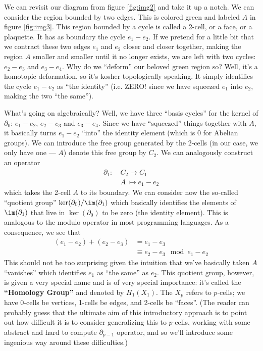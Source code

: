 We can revisit our diagram from figure \ref{fig:img2} and take it
up a notch. We can consider the region bounded by two edges. This
is colored green and labeled $A$ in figure \ref{fig:img3}. This
region bounded by a cycle is called a 2-cell, or a face, or a plaquette.
It has as boundary the cycle $e_{1}-e_{2}$. If we pretend for a
little bit that we contract these two edges $e_{1}$ and $e_{2}$
closer and closer together, making the region $A$ smaller and
smaller until it no longer exists, we are left with two cycles:
$e_{2}-e_{3}$ and $e_{3}-e_{4}$. Why do we ``deform'' our beloved
green region so? Well, it's a homotopic deformation, so it's
kosher topologically speaking. It simply identifies the cycle
$e_{1}-e_{2}$ as ``the identity'' (i.e. ZERO! since we have squeezed
$e_{1}$ into $e_{2}$, making the two ``the same'').

What's going on algebraically? Well, we have three ``basis
cycles'' for the kernel of $\partial_{0}$: $e_{1}-e_{2}$,
$e_{2}-e_{3}$ and $e_{3}-e_{4}$. Since we have ``squeezed''
things together with $A$, it basically turns $e_{1}-e_{2}$
``into'' the identity element (which is 0 for Abelian groups). We
can introduce the free group generated by the 2-cells (in our
case, we only have one --- $A$) denote this free group by
$C_{2}$. We can analogously construct an operator
\begin{equation}%
\begin{split}
\partial_{1}:~&C_{2}\to{C_{1}}\\
              &A~\mapsto{e_{1}-e_{2}}
\end{split}
\end{equation}
which takes the 2-cell $A$ to its boundary. We can consider now
the so-called ``quotient group''
$\ker(\partial_{0})/\im(\partial_{1})$ which basically identifies
the elements of $\im(\partial_{1})$ that live in
$\ker(\partial_{0})$ to be zero (the identity element). This is
analogous to the modulo operator in most programming
languages. As a consequence, we see that
\begin{equation}%
\begin{split}
(e_{1}-e_{2})+(e_{2}-e_{3}) &= e_{1}-e_{3}\\
 &\equiv e_{2}-e_{3} \mod {e_{1}-e_{2}}
\end{split}
\end{equation}
This should not be too surprising given the intuition that we've
basically taken $A$ ``vanishes'' which identifies $e_{1}$ as
``the same'' as $e_{2}$. This quotient group, however, is given a very
special name and is of very special importance: it's called the
\textbf{``Homology Group''} and denoted by $H_{1}(X_{1})$. The
$X_{p}$ refers to $p$-cells; we have 0-cells be vertices, 1-cells
be edges, and 2-cells be ``faces''. (The reader can probably
guess that the ultimate aim of this introductory approach is to
point out how difficult it is to consider generalizing this to
$p$-cells, working with some abstract and hard to compute
$\partial_{p-1}$ operator, and so we'll introduce some ingenious
way around these difficulties.)

